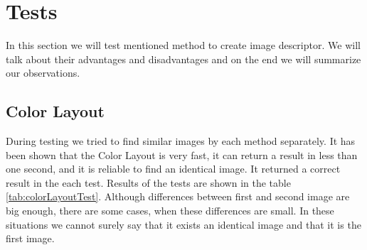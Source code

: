 \documentclass[12pt,a4paper]{report}
\begin{document}
\section{Tests}
\label{sec:tests}

In this section we will test mentioned method to create image descriptor. We will talk about their advantages and disadvantages and on the end we will summarize our observations.

\subsection{Color Layout}

During testing we tried to find similar images by each method separately. It has been shown that the Color Layout is very fast, it can return a result in less than one second, and it is reliable to find an identical image. It returned a correct result in the each test. Results of the tests are shown in the table \ref{tab:colorLayoutTest}. Although differences between first and second image are big enough, there are some cases, when these differences are small. In these situations we cannot surely say that it exists an identical image and that it is the first image.
\end{document}
